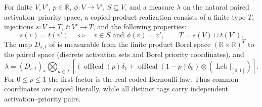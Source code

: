 \begin{definition}
For finite $V,V'$, $p\in\mathbb R$, $\phi:V\to V'$, $S\subseteq V$, and a
measure $\lambda$ on the natural paired activation--priority space, a
copied-product realization consists of a finite type $T$, injections
$s:V\to T$, $t:V'\to T$, and the following properties:
\[
s(v)=t(v')\quad\Longleftrightarrow\quad v\in S\text{ and }\phi(v)=v',
\qquad T=s(V)\cup t(V').
\]
The map $D_{s,t}$ of
 is measurable from the
finite product Borel space $(\mathbb R\times\mathbb R)^T$ to the paired
space (discrete activation sets and Borel priority coordinates), and
\[
\lambda=(D_{s,t})_*\bigotimes_{a\in T}
 \left[(\operatorname{ofReal}(p)\delta_1+
 \operatorname{ofReal}(1-p)\delta_0)\otimes
 (\operatorname{Leb}|_{[0,1]})\right].
\]
For $0\le p\le1$ the first factor is the real-coded Bernoulli law.
Thus common coordinates are copied literally, while all distinct tags carry
independent activation--priority pairs.
\end{definition}
